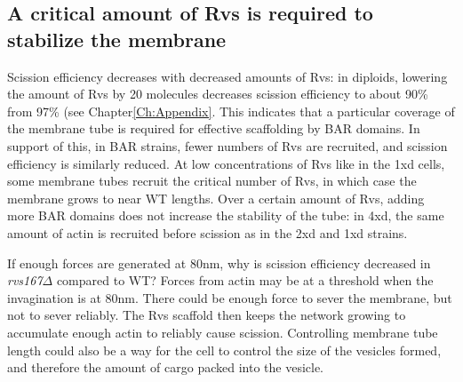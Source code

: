 
\subsection{A critical amount of Rvs is required to stabilize the membrane }

\vspace{5mm}
Scission efficiency decreases with decreased amounts of Rvs: in diploids, lowering the amount of Rvs by 20 molecules decreases scission efficiency to about 90\% from 97\% (see Chapter\ref{Ch:Appendix}. This indicates that a particular coverage of the membrane tube is required for effective scaffolding by BAR domains. In support of this, in BAR strains, fewer numbers of Rvs are recruited, and scission efficiency is similarly reduced. At low concentrations of Rvs like in the 1xd cells, some membrane tubes recruit the critical number of Rvs, in which case the membrane grows to near WT lengths. Over a certain amount of Rvs, adding more BAR domains does not increase the stability of the tube: in 4xd, the same amount of actin is recruited before scission as in the 2xd and 1xd strains. 

	\vspace{5mm}
If enough forces are generated at 80nm, why is scission efficiency decreased in \textit{rvs167$\Delta$} compared to WT? 
Forces from actin may be at a threshold when the invagination is at 80nm. There could be enough force to sever the membrane, but not to sever reliably. The Rvs scaffold then keeps the network growing to accumulate enough actin to reliably cause scission. Controlling membrane tube length could also be a way for the cell to control the size of the vesicles formed, and therefore the amount of cargo packed into the vesicle. 





